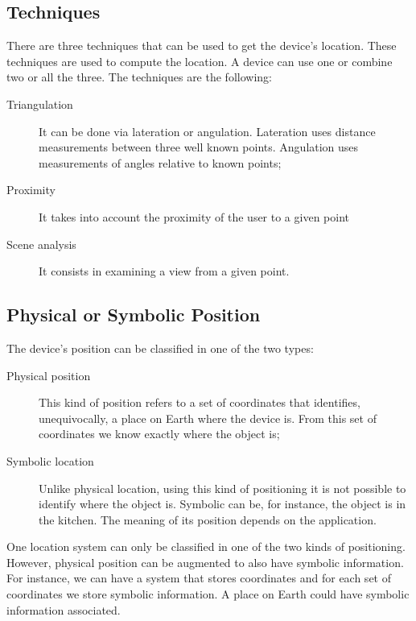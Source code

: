 \subsection{Techniques}
\label{sub:background_techniques}
There are three techniques that can be used to get the device's location.
These techniques are used to compute the location.
A device can use one or combine two or all the three.
The techniques are the following:
\begin{description}
  \item[Triangulation] It can be done via lateration or angulation. Lateration uses distance measurements between three well known points.
  Angulation uses measurements of angles relative to known points;
  \item[Proximity] It takes into account the proximity of the user to a given point
  \item[Scene analysis] It consists in examining a view from a given point.
\end{description}

\subsection{Physical or Symbolic Position}
\label{sub:background_physical_or_symbolic_position}
The device's position can be classified in one of the two types:
\begin{description}
  \item[Physical position] This kind of position refers to a set of coordinates that identifies, unequivocally, a place on Earth where the device is. From this set of coordinates we know exactly where the object is;
  \item[Symbolic location] Unlike physical location, using this kind of positioning it is not possible to identify where the object is. Symbolic can be, for instance, the object is in the kitchen.
  The meaning of its position depends on the application.
\end{description}

One location system can only be classified in one of the two kinds of positioning.
However, physical position can be augmented to also have symbolic information.
For instance, we can have a system that stores coordinates and for each set of coordinates we store symbolic information.
A place on Earth could have symbolic information associated.

